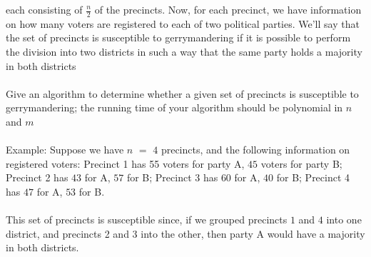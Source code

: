 \documentclass[12pt]{article}
\def\blankpage{%
      \clearpage%
      \thispagestyle{empty}%
      \addtocounter{page}{-1}%
      \null%
      \clearpage}
\begin{document}
each consisting of $\frac{n}{2}$ of the precincts. Now, for each precinct, we have information
on how many voters are registered to each of two political parties. We’ll say that the set of
precincts is susceptible to gerrymandering if it is possible to perform the division into two
districts in such a way that the same party holds a majority in both districts
\\\\
Give an algorithm to determine whether a given set of precincts is susceptible to gerrymandering;
the running time of your algorithm should be polynomial in $n$ and $m$
\\\\
Example: Suppose we have $n$ $=$ $4$ precincts, and the following information on registered
voters: Precinct 1 has 55 voters for party A, $45$ voters for party B; Precinct 2 has $43$ for A,
$57$ for B; Precinct 3 has $60$ for A, $40$ for B; Precinct 4 has $47$ for A, $53$ for B.
\\\\
This set of precincts is susceptible since, if we grouped precincts $1$ and $4$ into one district,
and precincts 2 and 3 into the other, then party A would have a majority in both districts.
\blankpage
\end{document}
